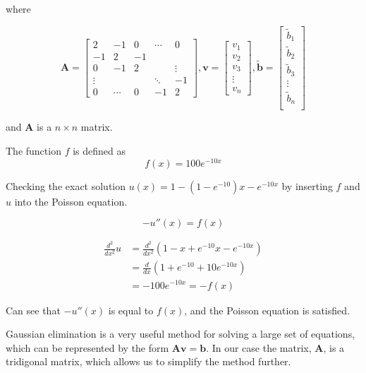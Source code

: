 \documentclass[%
oneside,                 %
final,                   %
10pt]{article}
\begin{document}
where

\begin{equation*}
\mathbf{A}=\begin{bmatrix}
2 & -1 & 0 & \cdots & 0\\
-1 & 2 & -1 & & \\
0 & -1 & 2 & & \vdots \\
\vdots & & & \ddots &-1\\
0 & \cdots & 0 & -1 & 2
\end{bmatrix},
\mathbf{v}=
\begin{bmatrix}
v_1\\
v_2\\
v_3\\
\vdots\\
v_n
\end{bmatrix},
\mathbf{\tilde{b}}=\begin{bmatrix}
\tilde{b}_1\\
\tilde{b}_2\\
\tilde{b}_3\\
\vdots\\
\tilde{b}_n\\
\end{bmatrix}
\end{equation*}

and $\mathbf{A}$ is a $n\times n$ matrix.

\vskip0.7cm
The function $f$ is defined as
$$f(x)=100e^{-10x}$$

Checking the exact solution $u(x)=1-(1-e^{-10})x-e^{-10x}$ by inserting $f$ and $u$ into the Poisson equation.

$$-u''(x)=f(x)$$

\begin{equation*}
\begin{split}
\frac{d^2}{dx^2}u&=\frac{d^2}{dx^2}(1-x+e^{-10}x-e^{-10x})\\
&=\frac{d}{dx}(1+e^{-10}+10e^{-10x})\\
&=-100e^{-10x} = -f(x)
\end{split}
\end{equation*}

Can see that $-u''(x)$ is equal to $f(x)$, and the Poisson equation is satisfied.

\vskip1cm




Gaussian elimination is a very useful method for solving a large set of equations, which can be represented by the form $\mathbf{Av}=\mathbf{b}$. In our case the matrix, $\mathbf{A}$, is a tridigonal matrix, which allows us to simplify the method further.
\end{document}
